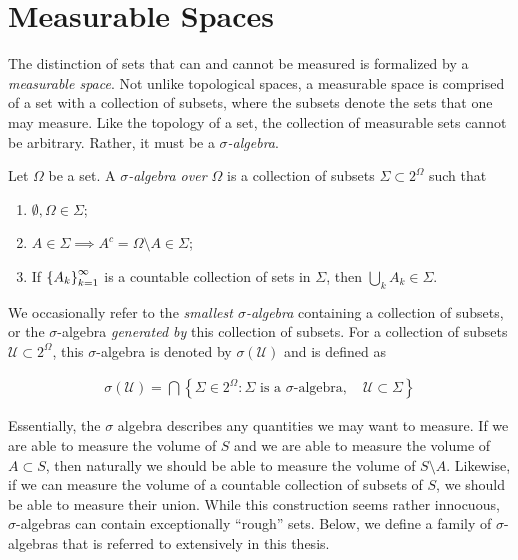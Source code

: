 \section{Measurable Spaces}\label{app:measure:measure}

The distinction of sets that can and cannot be measured is formalized
by a \emph{measurable space}. Not unlike topological spaces, a
measurable space is comprised of a set with a collection of subsets,
where the subsets denote the sets that one may measure. Like the
topology of a set, the collection of measurable sets cannot be
arbitrary. Rather, it must be a \emph{$\sigma$-algebra}.

\begin{definition}\label{def:sigma-algebra}
  Let $\Omega$ be a set. A \emph{$\sigma$-algebra over $\Omega$} is a
  collection of subsets $\Sigma\subset 2^\Omega$ such that

  \begin{enumerate}
  \item $\emptyset, \Omega\in\Sigma$;
  \item $A\in\Sigma\implies A^c = \Omega\setminus A\in\Sigma$;
  \item If $\indexedint{k}{\infty}{A}$ is a countable collection of sets in
    $\Sigma$, then $\bigcup_kA_k\in\Sigma$.
  \end{enumerate}

  We occasionally refer to the \emph{smallest $\sigma$-algebra}
  containing a collection of subsets, or the $\sigma$-algebra
  \emph{generated by} this collection of subsets. For a collection of
  subsets $\mathcal{U}\subset 2^\Omega$, this $\sigma$-algebra is denoted by
  $\sigma(\mathcal{U})$ and is defined as

  \begin{align*}
    \sigma(\mathcal{U}) = \bigcap\left\{\Sigma\in 2^\Omega :
    \Sigma\text{ is a $\sigma$-algebra},\quad \mathcal{U}\subset\Sigma\right\}
  \end{align*}
\end{definition}

Essentially, the $\sigma$ algebra describes any quantities we may want
to measure. If we are able to measure the volume of $S$ and we are
able to measure the volume of $A\subset S$, then naturally we should
be able to measure the volume of $S\setminus A$. Likewise, if we can
measure the volume of a countable collection of subsets of $S$, we
should be able to measure their union. While this construction seems
rather innocuous, $\sigma$-algebras can contain exceptionally
``rough'' sets. Below, we define a family of $\sigma$-algebras that is
referred to extensively in this thesis.

